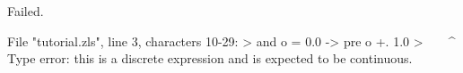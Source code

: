 \chklistingfalse
{}
\begin{ChkListingMsg}
Failed.
\end{ChkListingMsg}
\begin{ChkListingErr}
File "tutorial.zls", line 3, characters 10-29:
>  and o = 0.0 -> pre o +. 1.0
>          ^^^^^^^^^^^^^^^^^^^
Type error: this is a discrete expression and is expected to be continuous.
\end{ChkListingErr}
